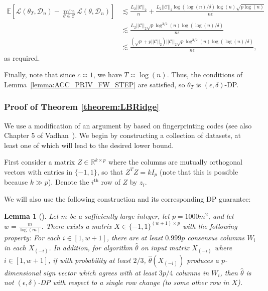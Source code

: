\documentclass{article}
\newtheorem{lemma}{Lemma}
\begin{document}
\begin{align*}
\mathbb{E}\left[\mathcal{L}(\theta_T, \mathcal{D}_n) - \mathop{\min}\limits_{\theta \in \mathcal{C}}\mathcal{L}(\theta, \mathcal{D}_n)\right] &\lesssim \frac{L_2||\mathcal{C}||_2}{n} + \frac{L_2||\mathcal{C}||_2\log(\log(n)/\delta)\log(n)\sqrt{p\log(n)}}{n\epsilon}\\
&\lesssim \frac{L_2||\mathcal{C}||_2\sqrt{p}\log^{3/2}(n)\log(\log(n)/\delta)}{n\epsilon}\\
&\lesssim \frac{(\sqrt{p} + p||\mathcal{C}||_2)||\mathcal{C}||_2\sqrt{p}\log^{3/2}(n)\log(\log(n)/\delta)}{n\epsilon},
\end{align*}
as required.

Finally, note that since $c \asymp 1$, we have $T \asymp \log(n)$. Thus, the conditions of Lemma~\ref{lemma:ACC_PRIV_FW_STEP} are satisfied, so $\theta_T$ is $(\epsilon, \delta)$-DP.

\subsubsection{Proof of Theorem \ref{theorem:LBRidge}}
\label{AppThmLBRidge}

We use a modification of an argument by \cite{NOPL} based on fingerprinting codes (see also Chapter 5 of Vadhan~\cite{Vad17}). We begin by constructing a collection of datasets, at least one of which will lead to the desired lower bound.

First consider a matrix $Z \in \mathbb{R}^{k \times p}$ where the columns are mutually orthogonal vectors with entries in $\{-1, 1\}$, so that $Z^TZ = kI_p$ (note that this is possible because $k \gg p$). Denote the $i^{\text{th}}$ row of $Z$ by $z_i$.

We will also use the following construction and its corresponding DP guarantee:

\begin{lemma}[\cite{NOPL}]
\label{lemma:FingX}
Let $m$ be a sufficiently large integer, let $p = 1000m^2$, and let $w = \frac{m}{\log(m)}$. There exists a matrix $X \in \{-1, 1\}^{(w + 1) \times p}$ with the following property: For each $i \in [1, w + 1]$, there are at least $0.999p$ consensus columns $W_i$
in each $X_{(-i)}$. In addition, for algorithm $\hat{\theta}$ on input matrix $X_{(-i)}$ where $i \in [1, w + 1]$, if with probability at least $2/3$, $\hat{\theta}(X_{(-i)})$ produces a $p$-dimensional sign
vector which agrees with at least $3p/4$ columns in $W_i$, then $\hat{\theta}$ is not $(\epsilon, \delta)$-DP with respect to a single row change (to some other row in $X$). 
\end{lemma}
\end{document}
